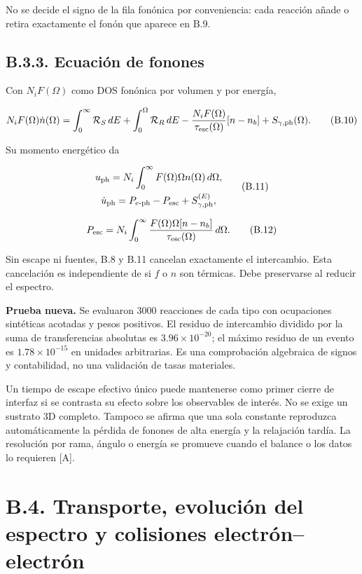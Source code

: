 \documentclass[
  spanish,
  10pt,
  a4paper,
]{article}
\newcounter{none} %
\begin{document}
No se decide el signo de la fila fonónica por conveniencia: cada
reacción añade o retira exactamente el fonón que aparece en B.9.

\subsection{B.3.3. Ecuación de
fonones}\label{b.3.3.-ecuaciuxf3n-de-fonones}

Con \(N_iF(\Omega)\) como DOS fonónica por volumen y por energía,

\[
N_iF(\Omega)\dot n(\Omega)=
\int_0^\infty\mathcal R_S\,dE+
\int_0^\Omega\mathcal R_R\,dE
-\frac{N_iF(\Omega)}{\tau_{\rm esc}(\Omega)}[n-n_b]
+S_{\gamma,\rm ph}(\Omega). \tag{B.10}
\]

Su momento energético da

\[
\begin{gathered}
u_{\rm ph}=N_i\int_0^\infty F(\Omega)\Omega n(\Omega)\,d\Omega,\\
\dot u_{\rm ph}=P_{e\text{-ph}}-P_{\rm esc}+S_{\gamma,\rm ph}^{(E)},
\end{gathered} \tag{B.11}
\]

\[
P_{\rm esc}=N_i\int_0^\infty
\frac{F(\Omega)\Omega[n-n_b]}{\tau_{\rm esc}(\Omega)}\,d\Omega. \tag{B.12}
\]

Sin escape ni fuentes, B.8 y B.11 cancelan exactamente el intercambio.
Esta cancelación es independiente de si \(f\) o \(n\) son térmicas. Debe
preservarse al reducir el espectro.

\textbf{Prueba nueva.} Se evaluaron 3000 reacciones de cada tipo con
ocupaciones sintéticas acotadas y pesos positivos. El residuo de
intercambio dividido por la suma de transferencias absolutas es
\(3.96\times10^{-20}\); el máximo residuo de un evento es
\(1.78\times10^{-15}\) en unidades arbitrarias. Es una comprobación
algebraica de signos y contabilidad, no una validación de tasas
materiales.

Un tiempo de escape efectivo único puede mantenerse como primer cierre
de interfaz si se contrasta su efecto sobre los observables de interés.
No se exige un sustrato 3D completo. Tampoco se afirma que una sola
constante reproduzca automáticamente la pérdida de fonones de alta
energía y la relajación tardía. La resolución por rama, ángulo o energía
se promueve cuando el balance o los datos lo requieren {[}A{]}.

\section{B.4. Transporte, evolución del espectro y colisiones
electrón--electrón}\label{b.4.-transporte-evoluciuxf3n-del-espectro-y-colisiones-electruxf3nelectruxf3n}
\end{document}
